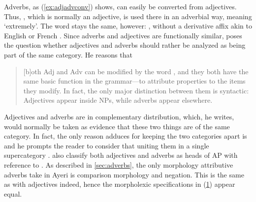Adverbs, as (\ref{ex:adjadvconv}) shows, can easily be converted from
adjectives. Thus, , which is normally an adjective,
is used there in an adverbial way, meaning `extremely'. The word stays the
same, however: , without a derivative affix akin to English
 or French . Since adverbs and adjectives are functionally
similar, \citet{carnie2013} poses the question whether adjectives and adverbs
should rather be analyzed as being part of the same category. He reasons that

\blockcquote[51]{carnie2013}{[b]oth Adj and Adv can be modified by the word
, and they both have the same basic function in the grammar---to
attribute properties to the items they modify. In fact, the only major
distinction between them is syntactic: Adjectives appear inside NPs, while
adverbs appear elsewhere.}

Adjectives and adverbs are in complementary distribution, which, he writes,
would normally be taken as evidence that these two things are of the same
category. In fact, the only reason \citet{carnie2013} adduces for keeping the
two categories apart is 
and he prompts the reader to consider that uniting them in a single
supercategory . \citet[126]{bresnan2016} also
classify both adjectives and adverbs as heads of AP with reference to
\citet{emonds1976}. As described in \autoref{sec:adverbs}, the only morphology
attributive adverbs take in Ayeri is comparison morphology and negation. This
is the same as with adjectives indeed, hence the morpholexic specifications
in (\ref{ex:advmorphlex}) appear equal.

\begin{figure}[h]
\begin{morphlex}
\ex\label{ex:advmorphlex}%
\xe
\end{morphlex}
\end{figure}

